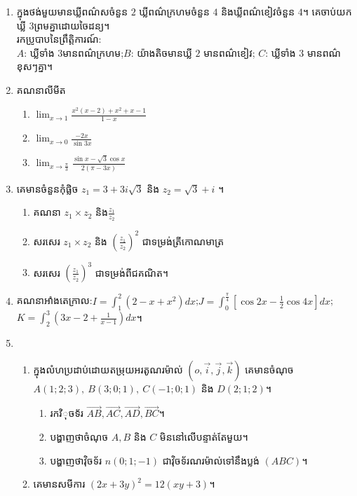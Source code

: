 \documentclass{officialexam}
\begin{document}
\begin{enumerate}[I]
	\item ក្នុងថង់មួយមានឃ្លីពណ៌សចំនួន $2$ ឃ្លីពណ៌ក្រហមចំនួន $4$ និងឃ្លីពណ៌ខៀវចំនួន $4$។ គេចាប់យកឃ្លី $3$ព្រមគ្នាដោយចៃដន្យ។\\
	រកប្រូបាបនៃព្រឹត្តិការណ៍:\\ $A$: ឃ្លីទាំង $3$មានពណ៌ក្រហម;\quad $B$: យ៉ាងតិចមានឃ្លី $2$ មានពណ៌ខៀវ; \quad $C$: ឃ្លីទាំង $3$ មានពណ៌ខុសៗគ្នា។
	\item គណនាលីមីត
		\begin{enumerate}[k,3]
			\item $\lim_{x\to1}\frac{x^2\left(x-2\right)+x^2+x-1}{1-x}$
			\item $\lim_{x\to0}\frac{-2x}{\sin3x}$
			\item $\lim_{x\to\frac{\pi}{3}}\frac{\sin x-\sqrt{3}\cos x}{2\left(\pi-3x\right)}$ 
		\end{enumerate}
	\item គេមានចំនួនកុំផ្លិច $z_1=3+3i\sqrt{3}$ និង $z_2=\sqrt{3}+i$ ។
	\begin{enumerate}[k,2]
		\item គណនា $z_1\times z_2$ និង$\frac{z_1}{z_2}$
		\item សរសេរ $z_1\times z_2$ និង $\left(\frac{z_1}{z_2}\right)^{2}$ ជាទម្រង់ត្រីកោណមាត្រ
		\item សរសេរ $\left(\frac{z_1}{z_2}\right)^{3}$ ជាទម្រង់ពីជគណិត។
	\end{enumerate}
	\item គណនាអាំងតេក្រាល:\quad $I=\int_{1}^{2}\left(2-x+x^2\right)dx$;\quad $J=\int_{0}^{\frac{\pi}{4}}\left[\cos2x-\frac{1}{2}\cos4x\right]dx$;\quad $K=\int_{2}^{3}\left(3x-2+\frac{1}{x-1}\right)dx$។
	\item \begin{enumerate}[1]
		\item ក្នុងលំហប្រដាប់ដោយតម្រុយអរតូណរម៉ាល់ $\left(o,\vec{i},\vec{j},\vec{k}\right)$ គេមានចំណុច $A\left(1;2;3\right),~B\left(3;0;1\right),~C\left(-1;0;1\right)$ និង $D\left(2;1;2\right)$។
		\begin{enumerate}[a]
			\item រកវិុចទ័រ $\overrightarrow{AB},\overrightarrow{AC},\overrightarrow{AD},\overrightarrow{BC}$។
			\item បង្ហាញថាចំណុច $A,B$ និង $C$ មិននៅលើបន្ទាត់តែមួយ។
			\item បង្ហាញថាវុិចទ័រ $n\left(0;1;-1\right)$ ជាវុិចទ័រណរម៉ាល់ទៅនឹងប្លង់ $\left(ABC\right)$។
		\end{enumerate}
		\item គេមានសមីការ $\left(2x+3y\right)^2=12\left(xy+3\right)$។\\

\end{enumerate}
\end{enumerate}
\end{document}
